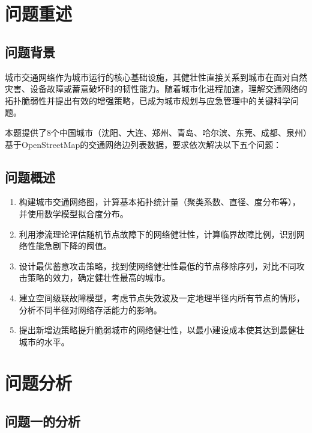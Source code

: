\documentclass[12pt,a4paper]{article}
\begin{document}
\newpage
\tableofcontents
\newpage

\section{问题重述}

\subsection{问题背景}

城市交通网络作为城市运行的核心基础设施，其健壮性直接关系到城市在面对自然灾害、设备故障或蓄意破坏时的韧性能力。随着城市化进程加速，理解交通网络的拓扑脆弱性并提出有效的增强策略，已成为城市规划与应急管理中的关键科学问题。

本题提供了8个中国城市（沈阳、大连、郑州、青岛、哈尔滨、东莞、成都、泉州）基于OpenStreetMap的交通网络边列表数据，要求依次解决以下五个问题：

\subsection{问题概述}

\begin{enumerate}[label=\textbf{问题\arabic*：}, leftmargin=4em]
    \item 构建城市交通网络图，计算基本拓扑统计量（聚类系数、直径、度分布等），并使用数学模型拟合度分布。
    \item 利用渗流理论评估随机节点故障下的网络健壮性，计算临界故障比例，识别网络性能急剧下降的阈值。
    \item 设计最优蓄意攻击策略，找到使网络健壮性最低的节点移除序列，对比不同攻击策略的效力，确定健壮性最高的城市。
    \item 建立空间级联故障模型，考虑节点失效波及一定地理半径内所有节点的情形，分析不同半径对网络存活能力的影响。
    \item 提出新增边策略提升脆弱城市的网络健壮性，以最小建设成本使其达到最健壮城市的水平。
\end{enumerate}

\section{问题分析}

\subsection{问题一的分析}
\end{document}
